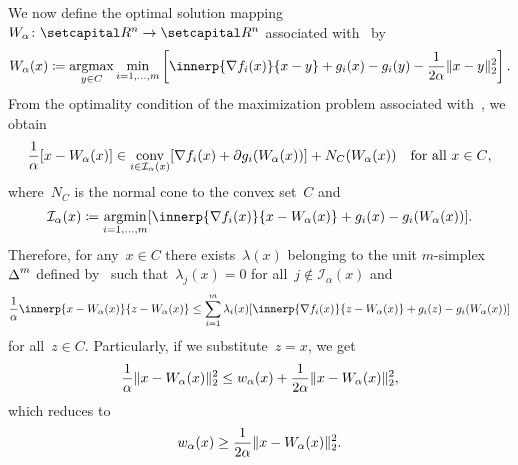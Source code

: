 \documentclass[../../main]{subfiles}
\begin{document}
We now define the optimal solution mapping~$W_\alpha \colon \setR^n \to \setR^n$ associated with~ by
\begin{equation} \label{eq:reg_lin_gap_MO_sol}
    W_\alpha(x) \coloneqq \argmax_{y \in C} \min_{i = 1, \dots, m} \left[ \innerp{\nabla f_i(x)}{x - y} + g_i(x) - g_i(y) - \frac{1}{2 \alpha} \norm{x - y}_2^2 \right] 
.\end{equation} 
From the optimality condition of the maximization problem associated with~, we obtain
\begin{equation}
    \frac{1}{\alpha} [x - W_\alpha(x)] \in \operatorname*{conv}_{i \in \mathcal{I}_\alpha(x)} [ \nabla f_i(x) + \partial g_i(W_\alpha(x)) ] + N_C(W_\alpha(x)) \quad \text{for all~$x \in C$}
,\end{equation} 
where~$N_C$ is the normal cone to the convex set~$C$ and
\begin{equation} \label{eq:reg_lin_gap_MO_active}
    \mathcal{I}_\alpha(x) \coloneqq \argmin_{i = 1, \dots, m} [\innerp{\nabla f_i(x)}{x - W_\alpha(x)} + g_i(x) - g_i(W_\alpha(x))]
.\end{equation} 
Therefore, for any~$x \in C$ there exists~$\lambda(x)$ belonging to the unit $m$-simplex~$\operatorname{\Delta}^m$ defined by~ such that~$\lambda_j(x) = 0$ for all~$j \notin \mathcal{I}_\alpha(x)$ and
\begin{equation} \label{eq:reg_lin_gap_optimality}
    \frac{1}{\alpha} \innerp{x - W_\alpha(x)}{z - W_\alpha(x)} \le \sum_{i = 1}^{m} \lambda_i(x) [\innerp{\nabla f_i(x)}{z - W_\alpha(x)} + g_i(z) - g_i(W_\alpha(x))]
\end{equation} 
for all~$z \in C$.
Particularly, if we substitute~$z = x$, we get
\begin{equation}
    \frac{1}{\alpha} \lVert x - W_\alpha(x)\rVert_2^2 \le w_\alpha(x) + \frac{1}{2 \alpha} \lVert x - W_\alpha(x)\rVert_2^2
,\end{equation}
which reduces to
\begin{equation} \label{eq:reg_lin_gap_MO_LB}
    w_\alpha(x) \ge \frac{1}{2 \alpha} \lVert x - W_\alpha(x)\rVert_2^2
.\end{equation}
\end{document}
